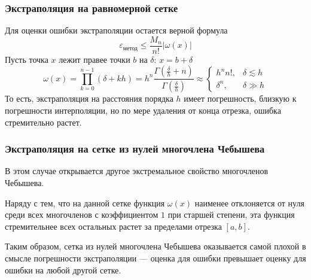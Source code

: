 \documentclass[aspectratio=169,unicode]{beamer}
\begin{document}
\begin{frame}
\frametitle{Экстраполяция на равномерной сетке}
	Для оценки ошибки экстраполяции остается верной формула
	\[
	\varepsilon_{\text{метод}} \leqslant \frac{M_n}{n!} |\omega(x)|
	\]
	Пусть точка $x$ лежит правее точки $b$ на $\delta$: $x = b + \delta$
	\[
	\omega(x) = \prod_{k=0}^{n-1} \left(\delta+kh\right) =
		h^n\frac{\Gamma\left(\frac{\delta}{h}+n\right)}{\Gamma\left(\frac{\delta}{h}\right)}
	\approx
	\begin{cases}
		h^n n!,& \delta \lesssim h\\
		\delta^n,& \delta \gg h
	\end{cases}
	\]
	То есть, экстраполяция на расстояния порядка $h$ имеет погрешность, близкую к погрешности интерполяции,
	но по мере удаления от конца отрезка, ошибка стремительно растет.
\end{frame}

\begin{frame}
\frametitle{Экстраполяция на сетке из нулей многочлена Чебышева}
	В этом случае открывается другое экстремальное свойство многочленов Чебышева.
	\pause

	Наряду с тем, что на данной сетке функция $\omega(x)$ наименее отклоняется от нуля
	среди всех многочленов с коэффициентом $1$ при старшей степени, эта функция
	стремительнее всех остальных растет за пределами отрезка $[a,b]$.
	\pause

	Таким образом, сетка из нулей многочлена Чебышева оказывается самой плохой
	в смысле погрешности экстраполяции --- оценка для ошибки превышает оценку
	для ошибки на любой другой сетке.
\end{frame}
\end{document}
